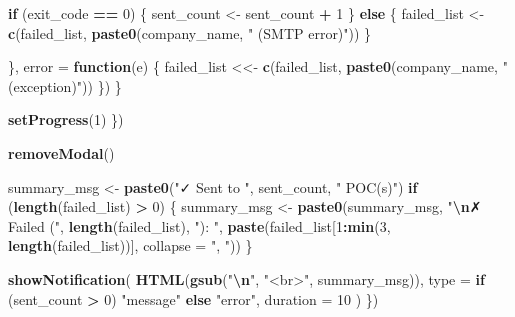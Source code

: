 \documentclass[
]{article}
\newenvironment{Shaded}{\begin{snugshade}}{\end{snugshade}}
\newcommand{\AttributeTok}[1]{\textcolor[rgb]{0.13,0.29,0.53}{#1}}
\newcommand{\ControlFlowTok}[1]{\textcolor[rgb]{0.13,0.29,0.53}{\textbf{#1}}}
\newcommand{\DecValTok}[1]{\textcolor[rgb]{0.00,0.00,0.81}{#1}}
\newcommand{\FunctionTok}[1]{\textcolor[rgb]{0.13,0.29,0.53}{\textbf{#1}}}
\newcommand{\NormalTok}[1]{#1}
\newcommand{\OtherTok}[1]{\textcolor[rgb]{0.56,0.35,0.01}{#1}}
\newcommand{\SpecialCharTok}[1]{\textcolor[rgb]{0.81,0.36,0.00}{\textbf{#1}}}
\newcommand{\StringTok}[1]{\textcolor[rgb]{0.31,0.60,0.02}{#1}}
\begin{document}
\begin{Shaded}
\begin{Highlighting}[]
            \ControlFlowTok{if}\NormalTok{ (exit\_code }\SpecialCharTok{==} \DecValTok{0}\NormalTok{) \{}
\NormalTok{              sent\_count }\OtherTok{\textless{}{-}}\NormalTok{ sent\_count }\SpecialCharTok{+} \DecValTok{1}
\NormalTok{            \} }\ControlFlowTok{else}\NormalTok{ \{}
\NormalTok{              failed\_list }\OtherTok{\textless{}{-}} \FunctionTok{c}\NormalTok{(failed\_list, }\FunctionTok{paste0}\NormalTok{(company\_name, }\StringTok{" (SMTP error)"}\NormalTok{))}
\NormalTok{            \}}
            
\NormalTok{          \}, }\AttributeTok{error =} \ControlFlowTok{function}\NormalTok{(e) \{}
\NormalTok{            failed\_list }\OtherTok{\textless{}\textless{}{-}} \FunctionTok{c}\NormalTok{(failed\_list, }\FunctionTok{paste0}\NormalTok{(company\_name, }\StringTok{" (exception)"}\NormalTok{))}
\NormalTok{          \})}
\NormalTok{        \}}
        
        \FunctionTok{setProgress}\NormalTok{(}\DecValTok{1}\NormalTok{)}
\NormalTok{      \})}
      
      \FunctionTok{removeModal}\NormalTok{()}
      
\NormalTok{      summary\_msg }\OtherTok{\textless{}{-}} \FunctionTok{paste0}\NormalTok{(}\StringTok{"✓ Sent to "}\NormalTok{, sent\_count, }\StringTok{" POC(s)"}\NormalTok{)}
      \ControlFlowTok{if}\NormalTok{ (}\FunctionTok{length}\NormalTok{(failed\_list) }\SpecialCharTok{\textgreater{}} \DecValTok{0}\NormalTok{) \{}
\NormalTok{        summary\_msg }\OtherTok{\textless{}{-}} \FunctionTok{paste0}\NormalTok{(summary\_msg, }\StringTok{"}\SpecialCharTok{\textbackslash{}n}\StringTok{✗ Failed ("}\NormalTok{, }\FunctionTok{length}\NormalTok{(failed\_list), }\StringTok{"): "}\NormalTok{,}
                              \FunctionTok{paste}\NormalTok{(failed\_list[}\DecValTok{1}\SpecialCharTok{:}\FunctionTok{min}\NormalTok{(}\DecValTok{3}\NormalTok{, }\FunctionTok{length}\NormalTok{(failed\_list))], }\AttributeTok{collapse =} \StringTok{", "}\NormalTok{))}
\NormalTok{      \}}
      
      \FunctionTok{showNotification}\NormalTok{(}
        \FunctionTok{HTML}\NormalTok{(}\FunctionTok{gsub}\NormalTok{(}\StringTok{"}\SpecialCharTok{\textbackslash{}n}\StringTok{"}\NormalTok{, }\StringTok{"\textless{}br\textgreater{}"}\NormalTok{, summary\_msg)),}
        \AttributeTok{type =} \ControlFlowTok{if}\NormalTok{ (sent\_count }\SpecialCharTok{\textgreater{}} \DecValTok{0}\NormalTok{) }\StringTok{"message"} \ControlFlowTok{else} \StringTok{"error"}\NormalTok{,}
        \AttributeTok{duration =} \DecValTok{10}
\NormalTok{      )}
\NormalTok{    \})}
    

\end{Highlighting}
\end{Shaded}
\end{document}
